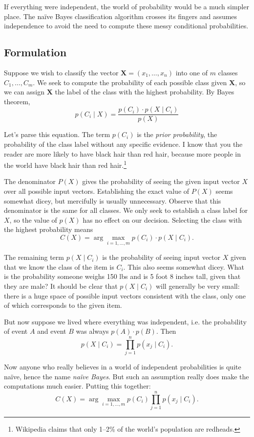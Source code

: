 \documentclass[10pt]{article}
\begin{document}
\begin{enumerate}
If everything were independent, the world of probability would be a much simpler place. The naïve Bayes classification algorithm crosses its fingers and assumes independence to avoid the need to compute these messy conditional probabilities.

\subsection*{Formulation}
Suppose we wish to classify the vector $\mathbf{X} = (x_1, \ldots, x_n)$ into one of $m$ classes $C_1, \ldots, C_m$. We seek to compute the probability of each possible class given $\mathbf{X}$, so we can assign $\mathbf{X}$ the label of the class with the highest probability. By Bayes theorem,
\[
p(C_i \mid X) = \frac{p(C_i) \cdot p(X \mid C_i)}{p(X)}
\]

Let's parse this equation. The term $p(C_i)$ is the \textit{prior probability}, the probability of the class label without any specific evidence. I know that you the reader are more likely to have black hair than red hair, because more people in the world have black hair than red hair.\footnote{Wikipedia claims that only 1--2\% of the world’s population are redheads.}

The denominator $P(X)$ gives the probability of seeing the given input vector $X$ over all possible input vectors. Establishing the exact value of $P(X)$ seems somewhat dicey, but mercifully is usually unnecessary. Observe that this denominator is the same for all classes. We only seek to establish a class label for $X$, so the value of $p(X)$ has no effect on our decision. Selecting the class with the highest probability means
\[
C(X) = \arg \max_{i = 1, \ldots, m} p(C_i) \cdot p(X \mid C_i).
\]

The remaining term $p(X \mid C_i)$ is the probability of seeing input vector $X$ given that we know the class of the item is $C_i$. This also seems somewhat dicey. What is the probability someone weighs 150 lbs and is 5 foot 8 inches tall, given that they are male? It should be clear that $p(X \mid C_i)$ will generally be very small: there is a huge space of possible input vectors consistent with the class, only one of which corresponds to the given item.

But now suppose we lived where everything was independent, i.e. the probability of event $A$ and event $B$ was always $p(A) \cdot p(B)$. Then
\[
p(X \mid C_i) = \prod_{j=1}^{n} p(x_j \mid C_i).
\]

Now anyone who really believes in a world of independent probabilities is quite naïve, hence the name \textit{naïve Bayes}. But such an assumption really does make the computations much easier. Putting this together:
\[
C(X) = \arg \max_{i = 1, \ldots, m} p(C_i) \prod_{j=1}^{n} p(x_j \mid C_i).
\]


\end{enumerate}
\end{document}
